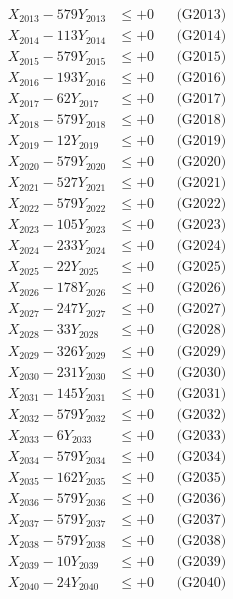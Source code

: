 \documentclass[a4paper,10pt]{article}
\begin{document}
{\begin{align}
X_{2013} - 579Y_{2013} &\leq +0 && \text{(G2013)} \\
X_{2014} - 113Y_{2014} &\leq +0 && \text{(G2014)} \\
X_{2015} - 579Y_{2015} &\leq +0 && \text{(G2015)} \\
X_{2016} - 193Y_{2016} &\leq +0 && \text{(G2016)} \\
X_{2017} - 62Y_{2017} &\leq +0 && \text{(G2017)} \\
X_{2018} - 579Y_{2018} &\leq +0 && \text{(G2018)} \\
X_{2019} - 12Y_{2019} &\leq +0 && \text{(G2019)} \\
X_{2020} - 579Y_{2020} &\leq +0 && \text{(G2020)} \\
\allowbreak
X_{2021} - 527Y_{2021} &\leq +0 && \text{(G2021)} \\
X_{2022} - 579Y_{2022} &\leq +0 && \text{(G2022)} \\
X_{2023} - 105Y_{2023} &\leq +0 && \text{(G2023)} \\
X_{2024} - 233Y_{2024} &\leq +0 && \text{(G2024)} \\
X_{2025} - 22Y_{2025} &\leq +0 && \text{(G2025)} \\
X_{2026} - 178Y_{2026} &\leq +0 && \text{(G2026)} \\
X_{2027} - 247Y_{2027} &\leq +0 && \text{(G2027)} \\
X_{2028} - 33Y_{2028} &\leq +0 && \text{(G2028)} \\
X_{2029} - 326Y_{2029} &\leq +0 && \text{(G2029)} \\
X_{2030} - 231Y_{2030} &\leq +0 && \text{(G2030)} \\
\allowbreak
X_{2031} - 145Y_{2031} &\leq +0 && \text{(G2031)} \\
X_{2032} - 579Y_{2032} &\leq +0 && \text{(G2032)} \\
X_{2033} - 6Y_{2033} &\leq +0 && \text{(G2033)} \\
X_{2034} - 579Y_{2034} &\leq +0 && \text{(G2034)} \\
X_{2035} - 162Y_{2035} &\leq +0 && \text{(G2035)} \\
X_{2036} - 579Y_{2036} &\leq +0 && \text{(G2036)} \\
X_{2037} - 579Y_{2037} &\leq +0 && \text{(G2037)} \\
X_{2038} - 579Y_{2038} &\leq +0 && \text{(G2038)} \\
X_{2039} - 10Y_{2039} &\leq +0 && \text{(G2039)} \\
X_{2040} - 24Y_{2040} &\leq +0 && \text{(G2040)} \\

\end{align}}
\end{document}

